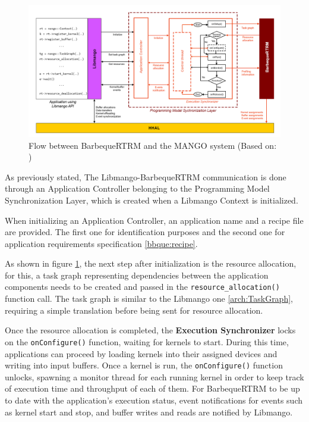 \begin{figure}[ht]
    \centering
    \includegraphics[width=\textwidth]{img/barbeque-flow.png}
    \captionsetup{justification=centering}
    \caption{Flow between BarbequeRTRM and the MANGO system (Based on: \cite{mango_exploring_manycore_architectures})}
    \label{fig:barbecue-flow}
\end{figure}

As previously stated, The Libmango-BarbequeRTRM communication is done through an Application Controller belonging to the Programming Model Synchronization Layer, which is created when a Libmango Context is initialized.

When initializing an Application Controller, an application name and a recipe file are provided. The first one for identification purposes and the second one for application requirements specification \ref{bbque:recipe}.

As shown in figure \ref{fig:barbecue-flow}, the next step after initialization is the resource allocation, for this, a task graph representing dependencies between the application components needs to be created and passed in the \texttt{resource\_allocation()} function call. The task graph is similar to the Libmango one \ref{arch:TaskGraph}, requiring a simple translation before being sent for resource allocation. 

Once the resource allocation is completed, the \textbf{Execution Synchronizer} locks on the \texttt{onConfigure()} function, waiting for kernels to start. During this time, applications can proceed by loading kernels into their assigned devices and writing into input buffers. Once a kernel is run, the \texttt{onConfigure()} function unlocks, spawning a monitor thread for each running kernel in order to keep track of execution time and throughput of each of them. 
For BarbequeRTRM to be up to date with the application's execution status, event notifications for events such as kernel start and stop, and buffer writes and reads are notified by Libmango.

